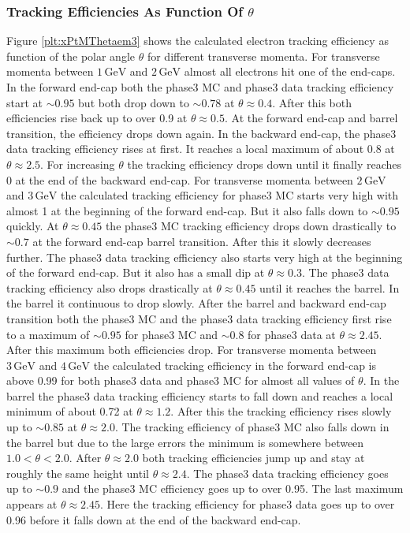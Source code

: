 \documentclass[a4paper,11pt,twosided,final,german,openbib,pdftex,listof=totoc,bibliography=totoc]{scrbook}
\begin{document}
\newpage

\subsubsection{Tracking Efficiencies As Function Of $\theta$}

Figure \ref{plt:xPtMThetaem3} shows the calculated electron tracking efficiency as function of the polar angle $\theta$ for different transverse momenta.
For transverse momenta between $1\,\textrm{GeV}$ and $2\,\textrm{GeV}$ almost all electrons hit one of the end-caps. In the forward end-cap both the phase3 MC and phase3 data tracking efficiency start at $\sim 0.95$ but both drop down to $\sim 0.78$ at $\theta \approx 0.4$. After this both efficiencies rise back up to over 0.9 at $\theta \approx 0.5$. At the forward end-cap and barrel transition, the efficiency drops down again. In the backward end-cap, the phase3 data tracking efficiency rises at first. It reaches a local maximum of about 0.8 at $\theta \approx 2.5$. For increasing $\theta$ the tracking efficiency drops down until it finally reaches 0 at the end of the backward end-cap.
For transverse momenta between $2\,\textrm{GeV}$ and $3\,\textrm{GeV}$ the calculated tracking efficiency for phase3 MC starts very high with almost 1 at the beginning of the forward end-cap. But it also falls down to $\sim 0.95$ quickly. At $\theta \approx 0.45$ the phase3 MC tracking efficiency drops down drastically to $\sim 0.7$ at the forward end-cap barrel transition. After this it slowly decreases further. The phase3 data tracking efficiency also starts very high at the beginning of the forward end-cap. But it also has a small dip at $\theta \approx 0.3$. The phase3 data tracking efficiency also drops drastically at $\theta \approx 0.45$ until it reaches the barrel. In the barrel it continuous to drop slowly. After the barrel and backward end-cap transition both the phase3 MC and the phase3 data tracking efficiency first rise to a maximum of $\sim 0.95$ for phase3 MC and $\sim 0.8$ for phase3 data at $\theta \approx 2.45$. After this maximum both efficiencies drop.
For transverse momenta between $3\,\textrm{GeV}$ and $4\,\textrm{GeV}$ the calculated tracking efficiency in the forward end-cap is above 0.99 for both phase3 data and phase3 MC for almost all values of $\theta$. In the barrel the phase3 data tracking efficiency starts to fall down and reaches a local minimum of about 0.72 at $\theta \approx 1.2$. After this the tracking efficiency rises slowly up to $\sim 0.85$ at $\theta \approx 2.0$. The tracking efficiency of phase3 MC also falls down in the barrel but due to the large errors the minimum is somewhere between $1.0 < \theta < 2.0$. After $\theta \approx 2.0$ both tracking efficiencies jump up and stay at roughly the same height until $\theta \approx 2.4$. The phase3 data tracking efficiency goes up to $\sim 0.9$ and the phase3 MC efficiency goes up to over 0.95. The last maximum appears at $\theta \approx 2.45$. Here the tracking efficiency for phase3 data goes up to over 0.96 before it  falls down at the end of the backward end-cap.
\end{document}
